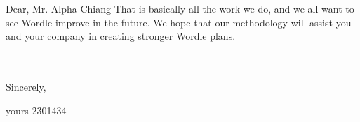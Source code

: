 \documentclass{mcmthesis}
\begin{document}
\begin{letter}{Dear, Mr. Alpha Chiang}
\hspace*{0.6cm}That is basically all the work we do, and we all want to see Wordle improve in the future. We hope that our methodology will assist you and your company in creating stronger Wordle plans.
	 
\vspace{\parskip}

\\
\\
Sincerely,

yours 2301434

\end{letter}
\end{document}
